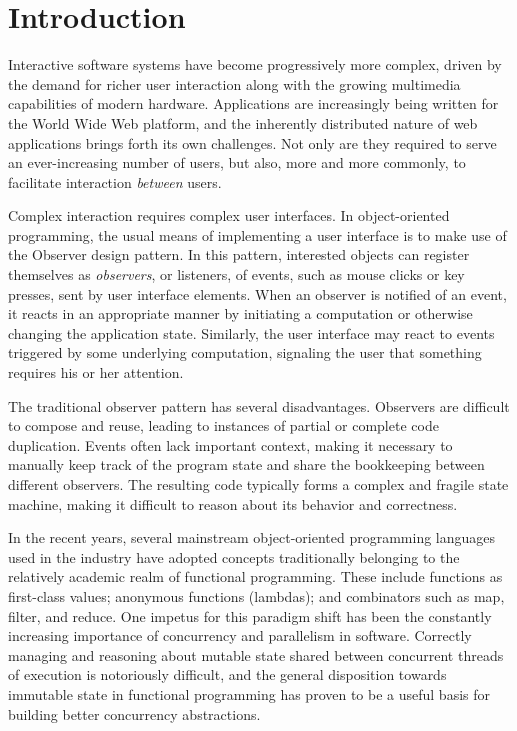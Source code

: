 \chapter{Introduction}

Interactive software systems have become progressively more complex, driven by the demand for richer user interaction along with the growing multimedia capabilities of modern hardware. Applications are increasingly being written for the World Wide Web platform, and the inherently distributed nature of web applications brings forth its own challenges. Not only are they required to serve an ever-increasing number of users, but also, more and more commonly, to facilitate interaction \emph{between} users. 

Complex interaction requires complex user interfaces. In object-oriented programming, the usual means of implementing a user interface is to make use of the Observer design pattern. In this pattern, interested objects can register themselves as \emph{observers}, or listeners, of events, such as mouse clicks or key presses, sent by user interface elements. When an observer is notified of an event, it reacts in an appropriate manner by initiating a computation or otherwise changing the application state. Similarly, the user interface may react to events triggered by some underlying computation, signaling the user that something requires his or her attention.

The traditional observer pattern has several disadvantages. Observers are difficult to compose and reuse, leading to instances of partial or complete code duplication. Events often lack important context, making it necessary to manually keep track of the program state and share the bookkeeping between different observers. The resulting code typically forms a complex and fragile state machine, making it difficult to reason about its behavior and correctness.

In the recent years, several mainstream object-oriented programming languages used in the industry have adopted concepts traditionally belonging to the relatively academic realm of functional programming. These include functions as first-class values; anonymous functions (lambdas); and combinators such as map, filter, and reduce. One impetus for this paradigm shift has been the constantly increasing importance of concurrency and parallelism in software. Correctly managing and reasoning about mutable state shared between concurrent threads of execution is notoriously difficult, and the general disposition towards immutable state in functional programming has proven to be a useful basis for building better concurrency abstractions.

